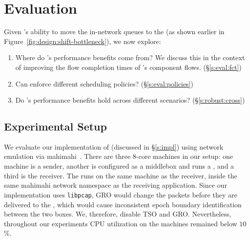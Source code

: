 \section{Evaluation}\label{s:eval}

Given \name's ability to move the in-network queues to the \inbox (as shown earlier in Figure~\ref{fig:design:shift-bottleneck}), we now explore:
\begin{enumerate}[leftmargin=15pt]
    \item Where do \name's performance benefits come from? We discuss this in the context of improving the flow completion times of \name's component flows. (\S\ref{s:eval:fct})
    \item Can \name enforce different scheduling policies? (\S\ref{s:eval:policies})
    \item Do \name's performance benefits hold across different scenarios? (\S\ref{s:robust:cross})
\end{enumerate}


\subsection{Experimental Setup}\label{s:eval:setup}

We evaluate our implementation of \name (discussed in \S\ref{s:impl}) using network emulation via mahimahi~\cite{mahimahi}.
There are three $8$-core machines in our setup: one machine is a sender, another is configured as a middlebox and runs a \inbox, and a third is the receiver. The \outbox runs on the same machine as the receiver, inside the same mahimahi network namespace as the receiving application. 
Since our \outbox implementation uses \texttt{libpcap}, GRO would change the packets before they are delivered to the \outbox, which would cause inconsistent epoch boundary identification between the two boxes. We, therefore, disable TSO and GRO.
Nevertheless, throughout our experiments CPU utilization on the machines remained below $10$\%.


